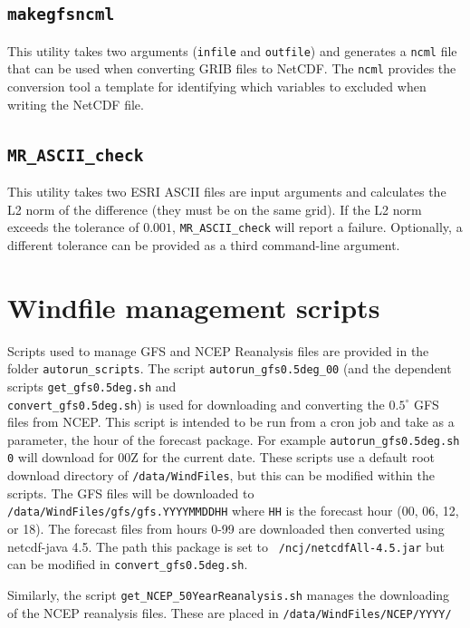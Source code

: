 \documentclass[11pt]{article}   %
\begin{document}
\subsection{\texttt{makegfsncml}}
This utility takes two arguments (\texttt{infile} and \texttt{outfile})
and generates a \texttt{ncml} file that can be used when converting
GRIB files to NetCDF.  The \texttt{ncml} provides the conversion tool a template
for identifying which variables to excluded when writing the NetCDF file.

\subsection{\texttt{MR\_ASCII\_check}}
This utility takes two ESRI ASCII files are input arguments and calculates the L2 norm of
the difference (they must be on the same grid).  If the L2 norm exceeds the tolerance of
$0.001$, \texttt{MR\_ASCII\_check} will report a failure.  Optionally, a different tolerance
can be provided as a third command-line argument.

\section{Windfile management scripts}
Scripts used to manage GFS and NCEP Reanalysis files are provided in the
folder \texttt{autorun\_scripts}.
The script \texttt{autorun\_gfs0.5deg\_00} (and the dependent scripts
\texttt{get\_gfs0.5deg.sh} and\\
\texttt{convert\_gfs0.5deg.sh}) is used for downloading and
converting the $0.5^{\circ}$ GFS files from NCEP.  This script is intended to be
run from a cron job and take as a parameter, the hour of the forecast package.  For example
\texttt{autorun\_gfs0.5deg.sh 0} will download for 00Z for the current date.  These 
scripts use a default root download directory of \texttt{/data/WindFiles}, but this can
be modified within the scripts.  The GFS files will be downloaded to\\
\texttt{/data/WindFiles/gfs/gfs.YYYYMMDDHH} where \texttt{HH} is the forecast hour
(00, 06, 12, or 18).  The forecast files from hours 0-99 are downloaded then converted using
netcdf-java 4.5.  The path this package is set to \texttt{~/ncj/netcdfAll-4.5.jar} but can be
modified in \texttt{convert\_gfs0.5deg.sh}.

Similarly, the script \texttt{get\_NCEP\_50YearReanalysis.sh} manages the downloading of 
the NCEP reanalysis files.  These are placed in \texttt{/data/WindFiles/NCEP/YYYY/}
\end{document}
